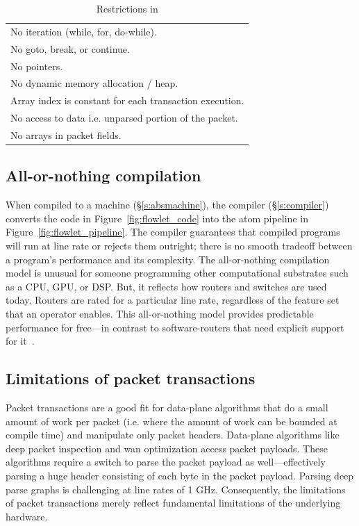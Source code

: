 \begin{table}
  \begin{tabular}{p{}}
    No iteration (while, for, do-while).\\
    No goto, break, or continue.\\
    No pointers.\\
    No dynamic memory allocation / heap.\\
    Array index is constant for each transaction execution.\\
    No access to data i.e. unparsed portion of the packet.\\
    No arrays in packet fields.\\
  \end{tabular}
  \caption{Restrictions in \pktlanguage}
  \label{tab:restrict}
\end{table}

\subsection{All-or-nothing compilation}

When compiled to a \absmachine machine (\S\ref{s:absmachine}), the \pktlanguage
compiler (\S\ref{s:compiler}) converts the code in
Figure~\ref{fig:flowlet_code} into the atom pipeline in
Figure~\ref{fig:flowlet_pipeline}. The compiler guarantees that compiled
programs will run at line rate or rejects them outright; there is no smooth
tradeoff between a program's performance and its complexity.  The
all-or-nothing compilation model is unusual for someone programming other
computational substrates such as a CPU, GPU, or DSP. But, it reflects how
routers and switches are used today. Routers are rated for a particular line
rate, regardless of the feature set that an operator enables. This
all-or-nothing model provides predictable performance for free---in contrast to
software-routers that need explicit support for it~\cite{dobrescu2012,
wenfei15}.

\subsection{Limitations of packet transactions}

Packet transactions are a good fit for data-plane algorithms that do a small
amount of work per packet (i.e. where the amount of work can be bounded at
compile time) and manipulate only packet headers. Data-plane algorithms like
deep packet inspection and wan optimization access packet payloads. These
algorithms require a switch to parse the packet payload as well---effectively
parsing a huge header consisting of each byte in the packet payload. Parsing
deep parse graphs is challenging at line rates of 1 GHz. Consequently, the
limitations of packet transactions merely reflect fundamental limitations of
the underlying hardware.
